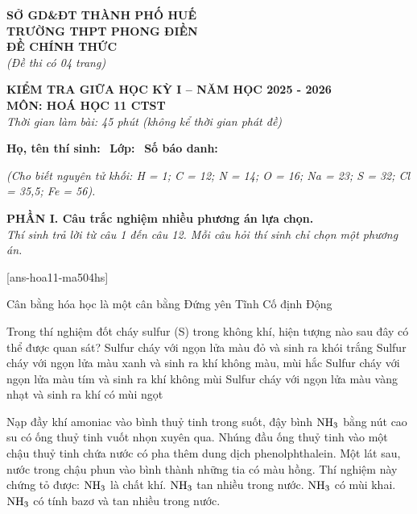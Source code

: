 \documentclass[12pt,a4paper]{article}
\begin{document}
\thispagestyle{firstpage}

\noindent
\begin{minipage}[t]{0.45\textwidth}
	\centering\fontsize{10pt}{12pt}\selectfont
	\textbf{SỞ GD\&ĐT THÀNH PHỐ HUẾ}\\
	\textbf{TRƯỜNG THPT PHONG ĐIỀN}\\
	\textbf{ĐỀ CHÍNH THỨC}\\
	\textit{(Đề thi có 04 trang)}
\end{minipage}\hfill
\begin{minipage}[t]{0.53\textwidth}
	\centering\small
	\textbf{KIỂM TRA GIỮA HỌC KỲ I -- NĂM HỌC 2025 - 2026}\\
	\textbf{MÔN: HOÁ HỌC 11 CTST}\\
	\textit{Thời gian làm bài: 45 phút (không kể thời gian phát đề)}\\
\end{minipage}

\smallskip
\noindent\hrulefill
\smallskip

\noindent\textbf{Họ, tên thí sinh:} \dotfill\ \textbf{Lớp:} \dotfill\ \textbf{Số báo danh:} \dotfill

\smallskip
\noindent\textit{(Cho biết nguyên tử khối: H = 1; C = 12; N = 14; O = 16; Na = 23; S = 32; Cl = 35,5; Fe = 56).}
\smallskip

\noindent
\textbf{PHẦN I. Câu trắc nghiệm nhiều phương án lựa chọn.}\\
\textit{Thí sinh trả lời từ câu 1 đến câu 12. Mỗi câu hỏi thí sinh chỉ chọn một phương án.}

[ans-hoa11-ma504hs]

\begin{ex}
Cân bằng hóa học là một cân bằng
\choice
{Đứng yên}
{Tĩnh}
{Cố định}
{Động}
\loigiai{}
\end{ex}

\begin{ex}
Trong thí nghiệm đốt cháy sulfur (S) trong không khí, hiện tượng nào sau đây có thể được quan sát?
\choice
{Sulfur cháy với ngọn lửa màu đỏ và sinh ra khói trắng}
{Sulfur cháy với ngọn lửa màu xanh và sinh ra khí không màu, mùi hắc}
{Sulfur cháy với ngọn lửa màu tím và sinh ra khí không mùi}
{Sulfur cháy với ngọn lửa màu vàng nhạt và sinh ra khí có mùi ngọt}
\loigiai{}
\end{ex}

\begin{ex}
Nạp đầy khí amoniac vào bình thuỷ tinh trong suốt, đậy bình $\ce{NH3}$ bằng nút cao su có ống thuỷ tinh vuốt nhọn xuyên qua. Nhúng đầu ống thuỷ tinh vào một chậu thuỷ tinh chứa nước có pha thêm dung dịch phenolphthalein. Một lát sau, nước trong chậu phun vào bình thành những tia có màu hồng. Thí nghiệm này chứng tỏ được:
\choice
{$\ce{NH3}$ là chất khí.}
{$\ce{NH3}$ tan nhiều trong nước.}
{$\ce{NH3}$ có mùi khai.}
{$\ce{NH3}$ có tính bazơ và tan nhiều trong nước.}
\loigiai{}
\end{ex}
\end{document}
